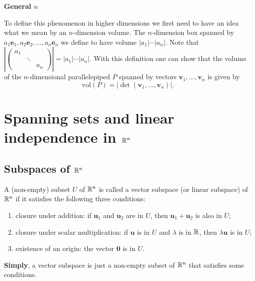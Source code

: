\documentclass[10pt, a4paper]{article}
\newcommand{\mbf}[1]{\mathbf{#1}}
\begin{document}
\textbf{General $n$}

To define this phenomenon in higher dimensions we first need to have an idea what we mean by an $n$-dimension volume.
The $n$-dimension box spanned by $a_1\mbf{e}_1, a_2\mbf{e}_2, \dotsc, a_n\mbf{e}_n$ we define to have volume $|a_1|\dotsi|a_n|$.
Note that $\left|\begin{pmatrix}
    a_1 & \phantom{} & \phantom{} \\ \phantom{} & \ddots & \phantom{} \\ \phantom{} & \phantom{} & a_n
\end{pmatrix}\right| = |a_1| \dotsi |a_n|$.
With this definition one can show that the volume of the $n$-dimensional parallelepiped $P$ spanned by vectors $\mbf{v}_1, \dotsc, \mbf{v}_n$ is given by
\[
\mathrm{vol}(P) = |\det(\mbf{v}_1, \dotsc, \mbf{v}_n)|.
\]

\newpage

\section{Spanning sets and linear independence in $\mathbb{R} ^ n$}
\subsection{Subspaces of $\mathbb{R} ^ n$}
\begin{definition}
    A (non-empty) subset $U$ of $\mathbb{R} ^ n$ is called a vector subspace (or linear subspace) of $\mathbb{R} ^ n$ if it satisfies the following three conditions:
    \begin{enumerate}[label = (\roman*)]
        \item closure under addition:
        if $\mbf{u}_1$ and $\mbf{u}_2$ are in $U$,
        then $\mbf{u}_1 + \mbf{u}_2$ is also in $U$;
        \item closure under scalar multiplication:
        if $\mbf{u}$ is in $U$ and $\lambda$ is in $\mathbb{R}$,
        then $\lambda\mbf{u}$ is in $U$;
        \item existence of an origin:
        the vector $\mbf{0}$ is in $U$.
    \end{enumerate}
\end{definition}
\textbf{Simply},
a vector subspace is just a non-empty subset of $\mathbb{R} ^ n$ that satisfies some conditions.
\end{document}
